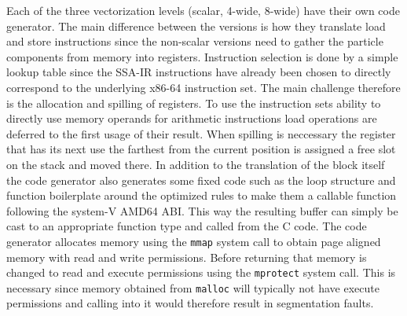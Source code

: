 Each of the three vectorization levels (scalar, 4-wide, 8-wide) have their own code generator. The main difference between the versions is how they translate load and store instructions since the non-scalar versions need to gather the particle components from memory into registers. Instruction selection is done by a simple lookup table since the SSA-IR instructions have already been chosen to directly correspond to the underlying x86-64 instruction set. The main challenge therefore is the allocation and spilling of registers. To use the instruction sets ability to directly use memory operands for arithmetic instructions load operations are deferred to the first usage of their result. When spilling is neccessary the register that has its next use the farthest from the current position is assigned a free slot on the stack and moved there. In addition to the translation of the block itself the code generator also generates some fixed code such as the loop structure and function boilerplate around the optimized rules to make them a callable function following the system-V AMD64 ABI. This way the resulting buffer can simply be cast to an appropriate function type and called from the C code. The code generator allocates memory using the \texttt{mmap} system call to obtain page aligned memory with read and write permissions. Before returning that memory is changed to read and execute permissions using the \texttt{mprotect} system call. This is necessary since memory obtained from \texttt{malloc} will typically not have execute permissions and calling into it would therefore result in segmentation faults.
